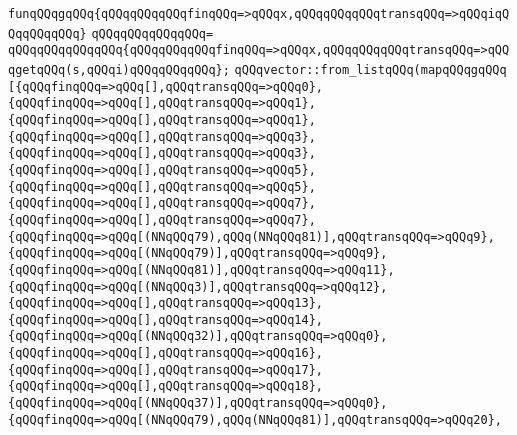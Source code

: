 \verb|funqQQqgqQQq{qQQqqQQqqQQqfinqQQq=>qQQqx,qQQqqQQqqQQqtransqQQq=>qQQqiqQQqqQQqqQQq}|\newline
\verb|qQQqqQQqqQQqqQQq=|\newline
\verb|qQQqqQQqqQQqqQQq{qQQqqQQqqQQqfinqQQq=>qQQqx,qQQqqQQqqQQqtransqQQq=>qQQqgetqQQq(s,qQQqi)qQQqqQQqqQQq};|\newline
\verb|qQQqvector::from_listqQQq(mapqQQqgqQQq|\newline
\verb|[{qQQqfinqQQq=>qQQq[],qQQqtransqQQq=>qQQq0},|\newline
\verb|{qQQqfinqQQq=>qQQq[],qQQqtransqQQq=>qQQq1},|\newline
\verb|{qQQqfinqQQq=>qQQq[],qQQqtransqQQq=>qQQq1},|\newline
\verb|{qQQqfinqQQq=>qQQq[],qQQqtransqQQq=>qQQq3},|\newline
\verb|{qQQqfinqQQq=>qQQq[],qQQqtransqQQq=>qQQq3},|\newline
\verb|{qQQqfinqQQq=>qQQq[],qQQqtransqQQq=>qQQq5},|\newline
\verb|{qQQqfinqQQq=>qQQq[],qQQqtransqQQq=>qQQq5},|\newline
\verb|{qQQqfinqQQq=>qQQq[],qQQqtransqQQq=>qQQq7},|\newline
\verb|{qQQqfinqQQq=>qQQq[],qQQqtransqQQq=>qQQq7},|\newline
\verb|{qQQqfinqQQq=>qQQq[(NNqQQq79),qQQq(NNqQQq81)],qQQqtransqQQq=>qQQq9},|\newline
\verb|{qQQqfinqQQq=>qQQq[(NNqQQq79)],qQQqtransqQQq=>qQQq9},|\newline
\verb|{qQQqfinqQQq=>qQQq[(NNqQQq81)],qQQqtransqQQq=>qQQq11},|\newline
\verb|{qQQqfinqQQq=>qQQq[(NNqQQq3)],qQQqtransqQQq=>qQQq12},|\newline
\verb|{qQQqfinqQQq=>qQQq[],qQQqtransqQQq=>qQQq13},|\newline
\verb|{qQQqfinqQQq=>qQQq[],qQQqtransqQQq=>qQQq14},|\newline
\verb|{qQQqfinqQQq=>qQQq[(NNqQQq32)],qQQqtransqQQq=>qQQq0},|\newline
\verb|{qQQqfinqQQq=>qQQq[],qQQqtransqQQq=>qQQq16},|\newline
\verb|{qQQqfinqQQq=>qQQq[],qQQqtransqQQq=>qQQq17},|\newline
\verb|{qQQqfinqQQq=>qQQq[],qQQqtransqQQq=>qQQq18},|\newline
\verb|{qQQqfinqQQq=>qQQq[(NNqQQq37)],qQQqtransqQQq=>qQQq0},|\newline
\verb|{qQQqfinqQQq=>qQQq[(NNqQQq79),qQQq(NNqQQq81)],qQQqtransqQQq=>qQQq20},|\newline
